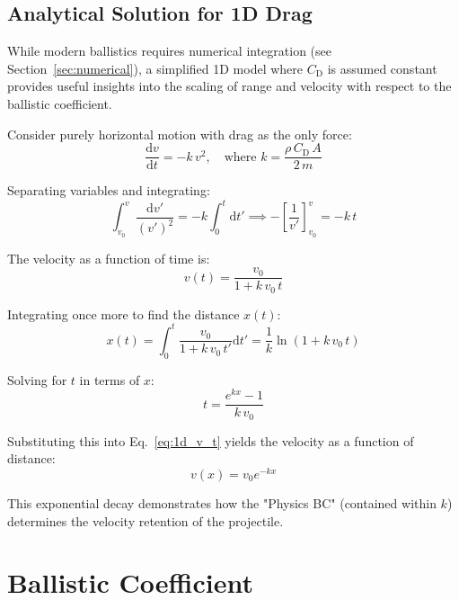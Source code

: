 \documentclass[11pt,twoside,openright]{report}
\newcommand{\dd}{\mathrm{d}}
\newcommand{\Cd}{C_{\mathrm{D}}}
\begin{document}
\subsection{Analytical Solution for 1D Drag}

While modern ballistics requires numerical integration (see Section~\ref{sec:numerical}), a simplified 1D model where $\Cd$ is assumed constant provides useful insights into the scaling of range and velocity with respect to the ballistic coefficient.

Consider purely horizontal motion with drag as the only force:
\begin{equation}
  \frac{\dd v}{\dd t} = -k\,v^2, \quad \text{where } k = \frac{\rho\,\Cd\,A}{2\,m}
  \label{eq:1d_drag_ode}
\end{equation}

Separating variables and integrating:
\begin{equation}
  \int_{v_0}^{v} \frac{\dd v'}{(v')^2} = -k \int_{0}^{t} \dd t' \implies -\left[\frac{1}{v'}\right]_{v_0}^{v} = -k\,t
\end{equation}

The velocity as a function of time is:
\begin{equation}
  \boxed{v(t) = \frac{v_0}{1 + k\,v_0\,t}}
  \label{eq:1d_v_t}
\end{equation}

Integrating once more to find the distance $x(t)$:
\begin{equation}
  x(t) = \int_{0}^{t} \frac{v_0}{1 + k\,v_0\,t'} \dd t' = \frac{1}{k} \ln(1 + k\,v_0\,t)
\end{equation}

Solving for $t$ in terms of $x$:
\begin{equation}
  t = \frac{e^{kx} - 1}{k\,v_0}
\end{equation}

Substituting this into Eq.~\eqref{eq:1d_v_t} yields the velocity as a function of distance:
\begin{equation}
  \boxed{v(x) = v_0 e^{-kx}}
  \label{eq:1d_v_x}
\end{equation}

This exponential decay demonstrates how the "Physics BC" (contained within $k$) determines the velocity retention of the projectile.

\section{Ballistic Coefficient}
\label{sec:bc}
\end{document}
